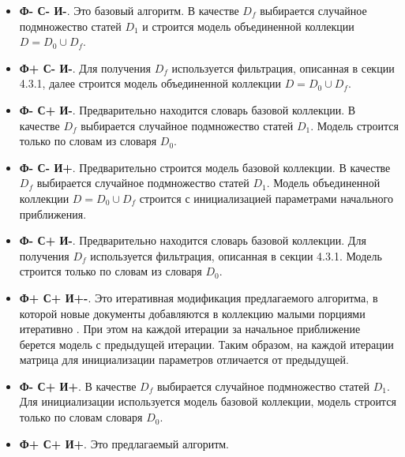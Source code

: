 \begin{itemize}
	\item \textbf{Ф- С- И-}. Это базовый алгоритм. В качестве $D_f$ выбирается случайное подмножество статей $D_1$ и строится модель объединенной коллекции $D = D_0 \cup D_f$. 
	\item \textbf{Ф+ С- И-}. Для получения $D_f$ используется фильтрация, описанная в секции 4.3.1, далее строится модель объединенной коллекции $D = D_0 \cup D_f$. 
	\item \textbf{Ф- С+ И-}. Предварительно находится словарь базовой коллекции. В качестве $D_f$ выбирается случайное подмножество статей $D_1$.  Модель строится только по словам из словаря $D_0$.
	\item \textbf{Ф- С- И+}. Предварительно строится модель базовой коллекции. В качестве $D_f$ выбирается случайное подмножество статей $D_1$. Модель объединенной коллекции $D = D_0 \cup D_f$ строится с инициализацией параметрами начального приближения.
	\item \textbf{Ф- С+ И-}. Предварительно находится словарь базовой коллекции. Для получения $D_f$ используется фильтрация, описанная в секции 4.3.1. Модель строится только по словам из словаря $D_0$.
	\item \textbf{Ф+ С+ И+-}. Это итеративная модификация предлагаемого алгоритма, в которой новые документы добавляются в коллекцию малыми порциями итеративно . При этом на каждой итерации за начальное приближение берется модель с предыдущей итерации. Таким образом, на каждой итерации матрица для инициализации параметров отличается от предыдущей.
	\item \textbf{Ф- С+ И+}. В качестве $D_f$ выбирается случайное подмножество статей $D_1$. Для инициализации используется модель базовой коллекции, модель строится только по словам словаря $D_0$.
	\item \textbf{Ф+ С+ И+}. Это предлагаемый алгоритм.

\end{itemize}

